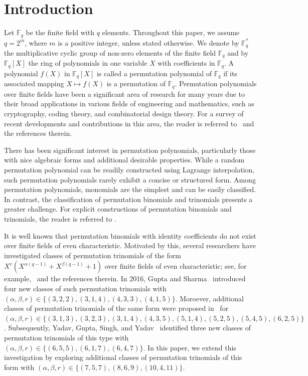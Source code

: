 \documentclass[12pt,reqno]{amsart}
\numberwithin{equation}{section}
\theoremstyle{definition}
\newcommand{\F}{\mathbb F}
\begin{document}
\section{Introduction}
Let $\mathbb{F}_{q}$ be the finite field with $q$ elements. Throughout this paper, we assume $q=2^m$, where $m$ is a positive integer, unless stated otherwise. We denote by $\F_q^*$ the multiplicative cyclic group of non-zero elements of the finite field $\F_q$ and by $\F_q[X]$ the ring of polynomials in one variable $X$ with coefficients in $\F_q$.  A polynomial $f(X)$ in $\mathbb{F}_{q}[X]$ is called a permutation polynomial of $\mathbb{F}_{q}$ if its associated mapping $X \mapsto f(X)$  is a permutation of $\mathbb{F}_{q}$. Permutation polynomials over finite fields have been a significant area of research for many years due to their broad applications in various fields of engineering and mathematics, such as cryptography, coding theory, and combinatorial design theory. For a survey of recent developments and contributions in this area, the reader is referred to~\cite{hou2015permutation,li2019survey,wang2024survey} and the references therein.

There has been significant interest in permutation polynomials, particularly those with nice algebraic forms and additional desirable properties. While a random permutation polynomial can be readily constructed using Lagrange interpolation, such permutation polynomials rarely exhibit a concise or structured form. Among permutation polynomials, monomials are the simplest and can be easily classified. In contrast, the classification of permutation binomials and trinomials presents a greater challenge. For explicit constructions of permutation binomials and trinomials, the reader is referred to \cite{gupta2022new,RG, hou2015survey, ZLF, wu2017permutation, KLQ2018, hou2015permutation, Li, NT2017, NT2019, ozbudak2023complete, LHJ2020}.

It is well known that permutation binomials with identity coefficients do not exist over finite fields of even characteristic. Motivated by this, several researchers have investigated classes of permutation trinomials of the form $X^{r}(X^{\alpha(q-1)}+X^{\beta(q-1)} + 1 )$ over finite fields of even characteristic; see, for example,~\cite{RG, Harsh, Li, ZLF} and the references therein. In 2016, Gupta and Sharma~\cite{RG} introduced four new classes of such permutation trinomials with $(\alpha, \beta, r)\in\{(3,2,2),(3,1,4),(4,3,3),(4,1,5)\}$. Moroever, additional classes of permutation trinomials of the same form were proposed in~\cite{Li, ZLF} for $(\alpha,\beta,r)\in\{(3,1,3),(3,2,3),(3,1,4),(4,3,5),(5,1,4),(5,2,5),(5,4,5),(6,2,5)\}$. Subsequently, Yadav, Gupta, Singh, and Yadav~\cite{Harsh} identified three new classes of permutation trinomials of this type with $(\alpha,\beta, r)\in\{(6,5,5),(6,1,7),(6,4,7)\}$. In this paper, we extend this investigation by  exploring additional classes of permutation trinomials of this form  with $(\alpha,\beta,r)\in\{(7,5,7),(8,6,9),(10,4,11)\}$.
\end{document}
